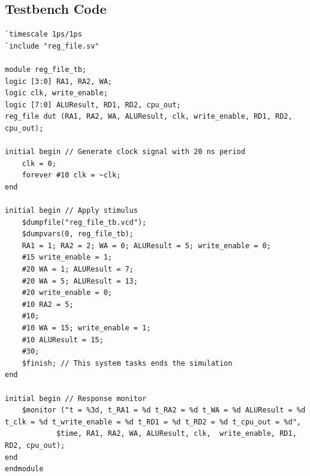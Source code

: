 \documentclass{article}
\begin{document}
\subsection{Testbench Code}
\begin{lstlisting}
`timescale 1ps/1ps 
`include "reg_file.sv"

module reg_file_tb;
logic [3:0] RA1, RA2, WA;
logic clk, write_enable;
logic [7:0] ALUResult, RD1, RD2, cpu_out;
reg_file dut (RA1, RA2, WA, ALUResult, clk, write_enable, RD1, RD2, cpu_out);

initial begin // Generate clock signal with 20 ns period
    clk = 0;
    forever #10 clk = ~clk;
end

initial begin // Apply stimulus 
    $dumpfile("reg_file_tb.vcd");
    $dumpvars(0, reg_file_tb);
    RA1 = 1; RA2 = 2; WA = 0; ALUResult = 5; write_enable = 0; 
    #15 write_enable = 1;
    #20 WA = 1; ALUResult = 7;
    #20 WA = 5; ALUResult = 13;
    #20 write_enable = 0;
    #10 RA2 = 5;
    #10;
    #10 WA = 15; write_enable = 1;
    #10 ALUResult = 15;
    #30;
    $finish; // This system tasks ends the simulation 
end

initial begin // Response monitor
    $monitor ("t = %3d, t_RA1 = %d t_RA2 = %d t_WA = %d ALUResult = %d t_clk = %d t_write_enable = %d t_RD1 = %d t_RD2 = %d t_cpu_out = %d",
            $time, RA1, RA2, WA, ALUResult, clk,  write_enable, RD1, RD2, cpu_out);
end
endmodule
\end{lstlisting}
\end{document}
